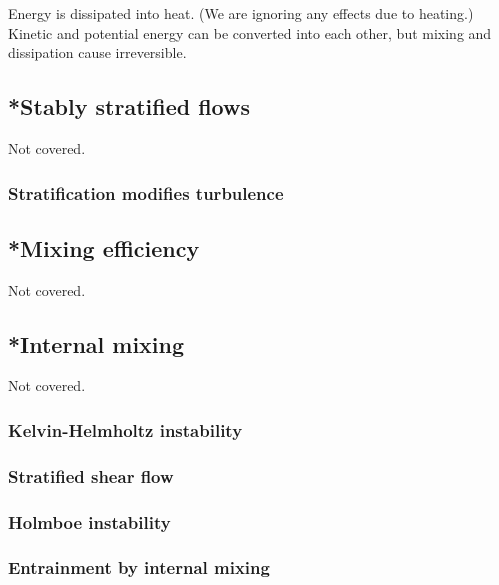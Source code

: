 Energy is dissipated into heat. (We are ignoring any effects due to heating.) Kinetic and potential energy can be converted into each other, but mixing and dissipation cause irreversible. 

\subsection{*Stably stratified flows}
Not covered.
\subsubsection{Stratification modifies turbulence}

\subsection{*Mixing efficiency}
Not covered.

\subsection{*Internal mixing}
Not covered. 
\subsubsection{Kelvin-Helmholtz instability}
\subsubsection{Stratified shear flow}
\subsubsection{Holmboe instability}
\subsubsection{Entrainment by internal mixing}
